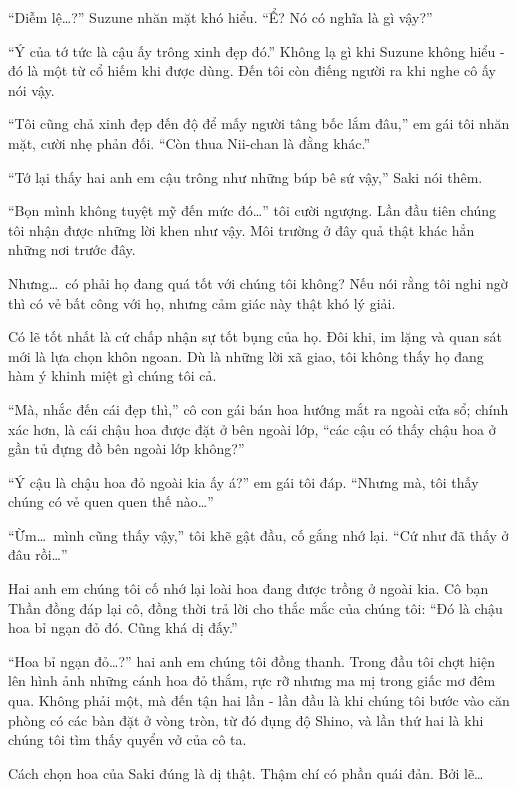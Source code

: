 \documentclass[../main.tex]{subfiles}
\begin{document}
``Diễm lệ\dots?'' Suzune nhăn mặt khó hiểu. ``Ể? Nó có nghĩa là gì vậy?''

``Ý của tớ tức là cậu ấy trông xinh đẹp đó.'' Không lạ gì khi Suzune không hiểu - đó là một từ cổ hiếm khi được dùng. Đến tôi còn điếng người ra khi nghe cô ấy nói vậy.

``Tôi cũng chả xinh đẹp đến độ để mấy người tâng bốc lắm đâu,'' em gái tôi nhăn mặt, cười nhẹ phản đối. ``Còn thua Nii-chan là đằng khác.''

``Tớ lại thấy hai anh em cậu trông như những búp bê sứ vậy,'' Saki nói thêm.

``Bọn mình không tuyệt mỹ đến mức đó\dots'' tôi cười ngượng. Lần đầu tiên chúng tôi nhận được những lời khen như vậy. Môi trường ở đây quả thật khác hẳn những nơi trước đây.

Nhưng\dots\ có phải họ đang quá tốt với chúng tôi không? Nếu nói rằng tôi nghi ngờ thì có vẻ bất công với họ, nhưng cảm giác này thật khó lý giải.

Có lẽ tốt nhất là cứ chấp nhận sự tốt bụng của họ. Đôi khi, im lặng và quan sát mới là lựa chọn khôn ngoan. Dù là những lời xã giao, tôi không thấy họ đang hàm ý khinh miệt gì chúng tôi cả.

``Mà, nhắc đến cái đẹp thì,'' cô con gái bán hoa hướng mắt ra ngoài cửa sổ; chính xác hơn, là cái chậu hoa được đặt ở bên ngoài lớp, ``các cậu có thấy chậu hoa ở gần tủ đựng đồ bên ngoài lớp không?''


``Ý cậu là chậu hoa đỏ ngoài kia ấy á?'' em gái tôi đáp. ``Nhưng mà, tôi thấy chúng có vẻ quen quen thế nào\dots''

``Ừm\dots\ mình cũng thấy vậy,'' tôi khẽ gật đầu, cố gắng nhớ lại. ``Cứ như đã thấy ở đâu rồi\dots''

Hai anh em chúng tôi cố nhớ lại loài hoa đang được trồng ở ngoài kia. Cô bạn Thần đồng đáp lại cô, đồng thời trả lời cho thắc mắc của chúng tôi: ``Đó là chậu hoa bỉ ngạn đỏ đó. Cũng khá dị đấy.''

``Hoa bỉ ngạn đỏ\dots?'' hai anh em chúng tôi đồng thanh. Trong đầu tôi chợt hiện lên hình ảnh những cánh hoa đỏ thắm, rực rỡ nhưng ma mị trong giấc mơ đêm qua. Không phải một, mà đến tận hai lần - lần đầu là khi chúng tôi bước vào căn phòng có các bàn đặt ở vòng tròn, từ đó đụng độ Shino, và lần thứ hai là khi chúng tôi tìm thấy quyển vở của cô ta.

Cách chọn hoa của Saki đúng là dị thật. Thậm chí có phần quái đản. Bởi lẽ\dots
\end{document}

